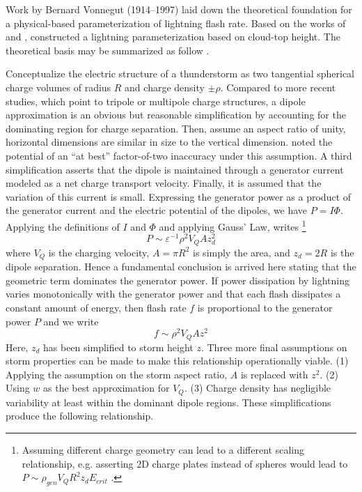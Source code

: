 	Work by Bernard Vonnegut (1914--1997) laid down the theoretical foundation for a physical-based parameterization of lightning flash rate.  Based on the works of \citet{Vonnegut:1963aa} and \citet{Williams:1985fk}, \citet{Price:1992wb} constructed a lightning parameterization based on cloud-top height. The theoretical basis may be summarized as follow \citep[after][]{Boccippio:2002uq}.

	Conceptualize the electric structure of a thunderstorm as two tangential spherical charge volumes of radius $R$ and charge density $\pm\rho$. Compared to more recent studies, which point to tripole \citep{Williams:1989uq} or multipole \citep{Stolzenburg:1998fk} charge structures, a dipole approximation is an obvious but reasonable simplification by accounting for the dominating region for charge separation. Then, assume an aspect ratio of unity, {\ie} horizontal dimensions are similar in size to the vertical dimension. \citet{Boccippio:2002uq} noted the potential of an ``at best'' factor-of-two inaccuracy under this assumption. A third simplification asserts that the dipole is maintained through a generator current modeled as a net charge transport velocity. Finally, it is assumed that the variation of this current is small.
	Expressing the generator power as a product of the generator current and the electric potential of the dipoles, we have $P = I\Phi$. Applying the definitions of $I$ and $\Phi$ and applying Gauss' Law, \citet{Boccippio:2002uq} writes \footnote{Assuming different charge geometry can lead to a different scaling relationship, e.g. asserting 2D charge plates instead of spheres would lead to $P\sim\rho_{gen}V_QR^2z_dE_{crit}$ \citep{Boccippio:2002uq}.}
	\begin{equation}\label{eqn:boccippio-P}
		P \sim \varepsilon^{-1}\rho^2V_QAz_d^2
	\end{equation}
	where $V_Q$ is the charging velocity, $A=\pi R^2$ is simply the area, and $z_d=2R$ is the dipole separation. Hence a fundamental conclusion is arrived here stating that the geometric term dominates the generator power. If power dissipation by lightning varies monotonically with the generator power and that each flash dissipates a constant amount of energy, then flash rate $f$ is proportional to the generator power $P$ and we write
	\begin{equation}\label{eqn:boccippio-f}
		f \sim \rho^2V_QAz^2
	\end{equation}
	Here, $z_d$ has been simplified to storm height $z$. Three more final assumptions on storm properties can be made to make this relationship operationally viable. (1) Applying the assumption on the storm aspect ratio, $A$ is replaced with $z^2$. (2) Using $w$ as the best approximation for $V_Q$. (3) Charge density has negligible variability at least within the dominant dipole regions. These simplifications produce the following relationship.
